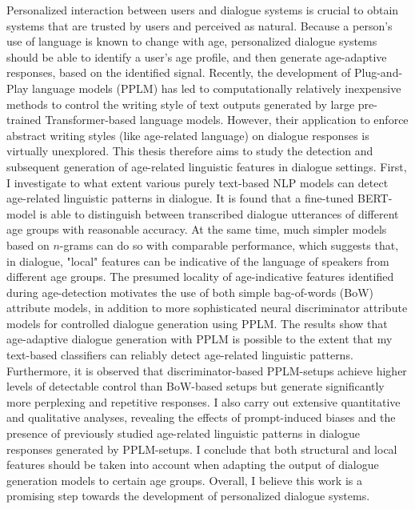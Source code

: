 Personalized interaction between users and dialogue systems is crucial to obtain systems that are trusted by users and perceived as natural.
Because a person's use of language is known to change with age, personalized dialogue systems should be able to identify a user's age profile, and then generate age-adaptive responses, based on the identified signal.
Recently, the development of Plug-and-Play language models (PPLM) has led to computationally relatively inexpensive methods to control the writing style of text outputs generated by large pre-trained Transformer-based language models.
However, their application to enforce abstract writing styles (like age-related language) on dialogue responses is virtually unexplored.
This thesis therefore aims to study the detection and subsequent generation of age-related linguistic features in dialogue settings.
First, I investigate to what extent various purely text-based NLP models can detect age-related linguistic patterns in dialogue.
It is found that a fine-tuned BERT-model is able to distinguish between transcribed dialogue utterances of different age groups with reasonable accuracy. 
At the same time, much simpler models based on $n$-grams can do so with comparable performance, which suggests that, in dialogue, "local" features can be indicative of the language of speakers from different age groups.
The presumed locality of age-indicative features identified during age-detection motivates the use of both simple bag-of-words (BoW) attribute models, in addition to more sophisticated neural discriminator attribute models for controlled dialogue generation using PPLM.
The results show that age-adaptive dialogue generation with PPLM is possible to the extent that my text-based classifiers can reliably detect age-related linguistic patterns.
Furthermore, it is observed that discriminator-based PPLM-setups achieve higher levels of detectable control than BoW-based setups but generate significantly more perplexing and repetitive responses.
I also carry out extensive quantitative and qualitative analyses, revealing the effects of prompt-induced biases and the presence of previously studied age-related linguistic patterns in dialogue responses generated by PPLM-setups.
I conclude that both structural and local features should be taken into account when adapting the output of dialogue generation models to certain age groups.
Overall, I believe this work is a promising step towards the development of personalized dialogue systems.

